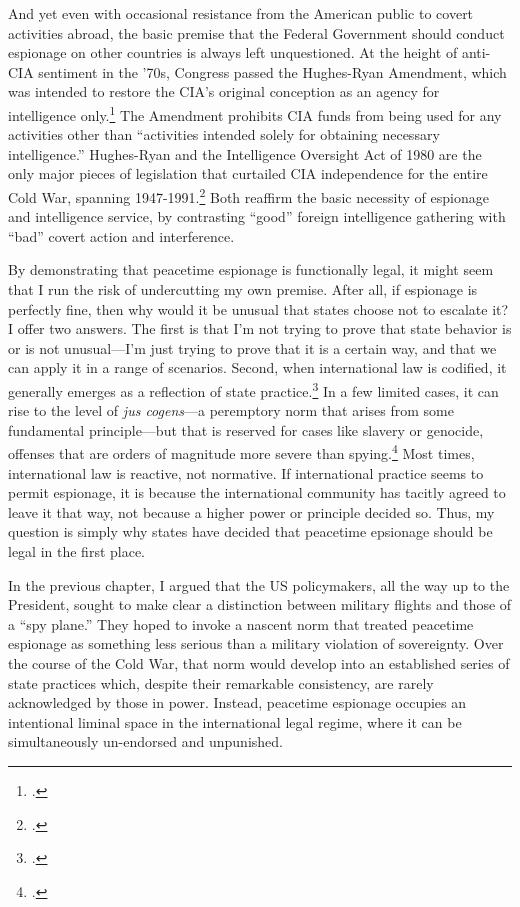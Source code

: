 \documentclass{report}
\begin{document}
\begin{refsegment}
And yet even with occasional resistance from the American public to covert activities abroad, the basic premise that the Federal Government should conduct espionage on other countries is always left unquestioned. At the height of anti-CIA sentiment in the '70s, Congress passed the Hughes-Ryan Amendment, which was intended to restore the CIA's original conception as an agency for intelligence only.\footcite[p.~215]{andrew_missing_1984} The Amendment prohibits CIA funds from being used for any activities other than ``activities intended solely for obtaining necessary intelligence.'' Hughes-Ryan and the Intelligence Oversight Act of 1980 are the only major pieces of legislation that curtailed CIA independence for the entire Cold War, spanning 1947-1991.\footcite[p.~93-94]{cogan_covert_1993} Both reaffirm the basic necessity of espionage and intelligence service, by contrasting ``good'' foreign intelligence gathering with ``bad'' covert action and interference.

By demonstrating that peacetime espionage is functionally legal, it might seem that I run the risk of undercutting my own premise. After all, if espionage is perfectly fine, then why would it be unusual that states choose not to escalate it? I offer two answers. The first is that I'm not trying to prove that state behavior is or is not unusual---I'm just trying to prove that it is a certain way, and that we can apply it in a range of scenarios. Second, when international law is codified, it generally emerges as a reflection of state practice.\footcite[p.~628]{sulmasy_counterintuitive_2007} In a few limited cases, it can rise to the level of \emph{jus cogens}---a peremptory norm that arises from some fundamental principle---but that is reserved for cases like slavery or genocide, offenses that are orders of magnitude more severe than spying.\footcite[p.~629]{sulmasy_counterintuitive_2007} Most times, international law is reactive, not normative. If international practice seems to permit espionage, it is because the international community has tacitly agreed to leave it that way, not because a higher power or principle decided so. Thus, my question is simply why states have decided that peacetime epsionage should be legal in the first place.

In the previous chapter, I argued that the US policymakers, all the way up to the President, sought to make clear a distinction between military flights and those of a ``spy plane.'' They hoped to invoke a nascent norm that treated peacetime espionage as something less serious than a military violation of sovereignty. Over the course of the Cold War, that norm would develop into an established series of state practices which, despite their remarkable consistency, are rarely acknowledged by those in power. Instead, peacetime espionage occupies an intentional liminal space in the international legal regime, where it can be simultaneously un-endorsed and unpunished.


\end{refsegment}
\end{document}
